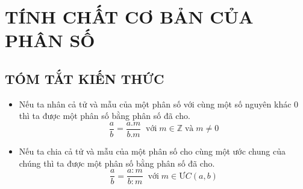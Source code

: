 \section{TÍNH CHẤT CƠ BẢN CỦA PHÂN SỐ}
\subsection{TÓM TẮT KIẾN THỨC}
\begin{tomtat}
\begin{itemize}
\item Nếu ta nhân cả tử và mẫu của một phân số với cùng một số nguyên khác $0$ thì ta được một phân số bằng phân số đã cho.
\[ \dfrac{a}{b} =\dfrac{a.m}{b.m} \;\; \text{với} \;m \in \mathbb{Z} \;\text{và}\; m\neq 0\]
\item Nếu ta chia cả tử và mẫu của một phân số cho cùng một ước chung của chúng thì ta được một phân số bằng phân số đã cho.
\[ \dfrac{a}{b} =\dfrac{a:m}{b:m} \; \;\text{với}\; m \in \text{Ư}C(a,b) \]
\end{itemize}
\end{tomtat}
